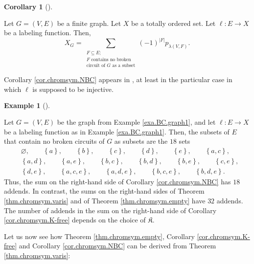 \documentclass[numbers=enddot,12pt,final,onecolumn,notitlepage]{scrartcl}%
\theoremstyle{definition}
\newtheorem{coro}[theo]{Corollary}
\newenvironment{corollary}[1][]
{\begin{coro}[#1]\begin{leftbar}}
{\end{leftbar}\end{coro}}
\newtheorem{exmp}[theo]{Example}
\newenvironment{example}[1][]
{\begin{exmp}[#1]\begin{leftbar}}
{\end{leftbar}\end{exmp}}
\let\sumnonlimits\sum
\renewcommand{\sum}{\sumnonlimits\limits}
\begin{document}
\begin{corollary}
\label{cor.chromsym.NBC}Let $G=\left(  V,E\right)  $ be a finite graph. Let
$X$ be a totally ordered set. Let $\ell:E\rightarrow X$ be a labeling
function. Then,%
\[
X_{G}=\sum_{\substack{F\subseteq E;\\F\text{ contains no broken}%
\\\text{circuit of }G\text{ as a subset}}}\left(  -1\right)  ^{\left\vert
F\right\vert }p_{\lambda\left(  V,F\right)  }.
\]

\end{corollary}

Corollary \ref{cor.chromsym.NBC} appears in \cite[Theorem 2.9]{Stanley-chsym},
at least in the particular case in which $\ell$ is supposed to be injective.

\begin{example}
Let $G=\left(  V,E\right)  $ be the graph from Example \ref{exa.BC.graph1},
and let $\ell:E\rightarrow X$ be a labeling function as in Example
\ref{exa.BC.graph1}. Then, the subsets of $E$ that contain no broken circuits
of $G$ as subsets are the $18$ sets%
\begin{align*}
&  \varnothing,\qquad\left\{  a\right\}  ,\qquad\left\{  b\right\}
,\qquad\left\{  c\right\}  ,\qquad\left\{  d\right\}  ,\qquad\left\{
e\right\}  ,\qquad\left\{  a,c\right\}  ,\\
&  \left\{  a,d\right\}  ,\qquad\left\{  a,e\right\}  ,\qquad\left\{
b,c\right\}  ,\qquad\left\{  b,d\right\}  ,\qquad\left\{  b,e\right\}
,\qquad\left\{  c,e\right\}  ,\\
&  \left\{  d,e\right\}  ,\qquad\left\{  a,c,e\right\}  ,\qquad\left\{
a,d,e\right\}  ,\qquad\left\{  b,c,e\right\}  ,\qquad\left\{  b,d,e\right\}  .
\end{align*}
Thus, the sum on the right-hand side of Corollary \ref{cor.chromsym.NBC} has
$18$ addends. In contrast, the sums on the right-hand sides of Theorem
\ref{thm.chromsym.varis} and of Theorem \ref{thm.chromsym.empty} have $32$
addends. The number of addends in the sum on the right-hand side of Corollary
\ref{cor.chromsym.K-free} depends on the choice of $\mathfrak{K}$.
\end{example}

Let us now see how Theorem \ref{thm.chromsym.empty}, Corollary
\ref{cor.chromsym.K-free} and Corollary \ref{cor.chromsym.NBC} can be derived
from Theorem \ref{thm.chromsym.varis}:
\end{document}

